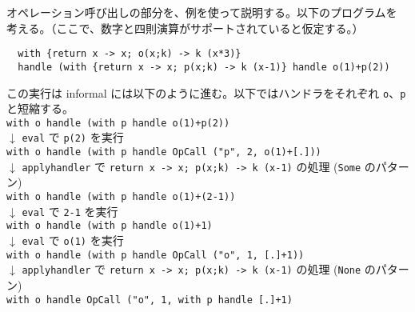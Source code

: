 オペレーション呼び出しの部分を、例を使って説明する。以下のプログラムを
考える。（ここで、数字と四則演算がサポートされていると仮定する。）
\vspace{-5pt}
\begin{verbatim}
  with {return x -> x; o(x;k) -> k (x*3)}
  handle (with {return x -> x; p(x;k) -> k (x-1)} handle o(1)+p(2))
\end{verbatim}
\vspace{-5pt}
この実行は informal には以下のように進む。以下ではハンドラをそれぞれ \texttt{\LBR{}o\RBR}、\texttt{\LBR{}p\RBR} と短縮する。
\vspace{5pt}
\\
\hspace{20pt}\texttt{with \LBR{}o\RBR{} handle (with \LBR{}p\RBR{} handle o(1)+p(2))}\\
\hspace{20pt}$\downarrow$ \texttt{eval} で \texttt{p(2)} を実行\\
\hspace{20pt}\texttt{with \LBR{}o\RBR{} handle (with \LBR{}p\RBR{} handle OpCall ("p", 2, o(1)+[.]))}\\
\hspace{20pt}$\downarrow$ \texttt{apply\US{}handler} で \texttt{\LBR{}return x -> x; p(x;k) -> k (x-1)\RBR} の処理 (\texttt{Some} のパターン)\\
\hspace{20pt}\texttt{with \LBR{}o\RBR{} handle (with \LBR{}p\RBR{} handle o(1)+(2-1))}\\
\hspace{20pt}$\downarrow$ \texttt{eval} で \texttt{2-1} を実行\\
\hspace{20pt}\texttt{with \LBR{}o\RBR{} handle (with \LBR{}p\RBR{} handle o(1)+1)}\\
\hspace{20pt}$\downarrow$ \texttt{eval} で \texttt{o(1)} を実行\\
\hspace{20pt}\texttt{with \LBR{}o\RBR{} handle (with \LBR{}p\RBR{} handle OpCall ("o", 1, [.]+1))}\\
\hspace{20pt}$\downarrow$ \texttt{apply\US{}handler} で \texttt{\LBR{}return x -> x; p(x;k) -> k (x-1)\RBR} の処理 (\texttt{None} のパターン)\\
\hspace{20pt}\texttt{with \LBR{}o\RBR{} handle OpCall ("o", 1, with \LBR{}p\RBR{} handle [.]+1)}\\
